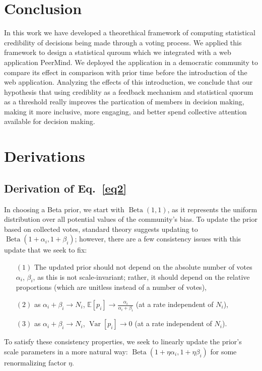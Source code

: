 \documentclass[format=acmsmall, review=true, screen=true, anonymous=true]{acmart}
\begin{document}
\section{Conclusion}
\label{sec:conclusion}

In this work we have developed a theorethical framework of computing statistical credibility
of decisions being made through a voting process.
We applied this framework to design a statistical quroum which we integrated with a web application
PeerMind.
We deployed the application in a democratic community to compare its effect in comparison with
prior time before the introduction of the web application.
Analyzing the effects of this introduction, we conclude that our hypothesis that using
crediblity as a feedback mechanism and statistical quorum as a threshold really improves
the partication of members in decision making, making it more inclusive, more engaging, and
better spend collective attention available for decision making.

\appendix
\section{Derivations}
\label{sec:derivation}


\subsection{Derivation of Eq.~\eqref{eq2}}
In choosing a Beta prior, we start with $\operatorname{Beta}(1,1)$, as it represents the uniform distribution over all potential values of the community's bias.  To update the prior based on collected votes, standard theory suggests updating to $\operatorname{Beta}(1+\alpha_i,1+\beta_i)$; however, there are a few consistency issues with this update that we seek to fix:
\begin{itemize}
\item[$(1)$] The updated prior should not depend on the absolute number of votes $\alpha_i$, $\beta_i$, as this is not scale-invariant; rather, it should depend on the relative proportions (which are unitless instead of a number of votes),
\item[$(2)$] as $\alpha_i + \beta_i \rightarrow N_i$, $\mathbb{E}[p_i] \rightarrow \frac{\alpha_i}{\alpha_i+\beta_i}$ (at a rate independent of $N_i$),
\item[$(3)$] as $\alpha_i + \beta_i \rightarrow N_i$, $\operatorname{Var}[p_i] \rightarrow 0$ (at a rate independent of $N_i$).
\end{itemize}
To satisfy these consistency properties, we seek to linearly update the prior's scale parameters in a more natural way: $\operatorname{Beta}(1+\eta\alpha_i,1+\eta\beta_i)$ for some renormalizing factor $\eta$.
\end{document}
